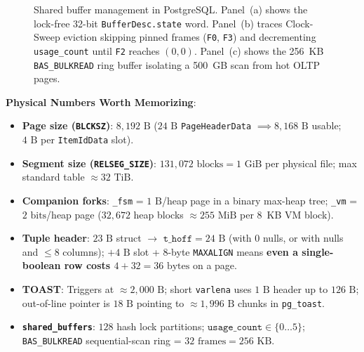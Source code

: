 \begin{figure}[htbp]
{%
}
\caption{Shared buffer management in PostgreSQL. Panel~(a) shows the lock-free 32-bit \texttt{BufferDesc.state} word. Panel~(b) traces Clock-Sweep eviction skipping pinned frames (\texttt{F0}, \texttt{F3}) and decrementing \texttt{usage\_count} until \texttt{F2} reaches $(0, 0)$. Panel~(c) shows the 256~KB \texttt{BAS\_BULKREAD} ring buffer isolating a 500~GB scan from hot OLTP pages.}
\label{fig:ch02-clock-sweep-ring}
\end{figure}

\begin{complexitybox}
\textbf{Physical Numbers Worth Memorizing}:
\begin{itemize}
  \item \textbf{Page size (\texttt{BLCKSZ})}: $8{,}192\text{ B}$ ($24\text{ B}$ \texttt{PageHeaderData} $\implies 8{,}168\text{ B}$ usable; $4\text{ B}$ per \texttt{ItemIdData} slot).
  \item \textbf{Segment size (\texttt{RELSEG\_SIZE})}: $131{,}072\text{ blocks} = 1\text{ GiB}$ per physical file; max standard table $\approx 32\text{ TiB}$.
  \item \textbf{Companion forks}: \texttt{\_fsm} = $1\text{ B}$/heap page in a binary max-heap tree; \texttt{\_vm} = $2\text{ bits}$/heap page ($32{,}672$ heap blocks $\approx 255\text{ MiB}$ per 8~KB VM block).
  \item \textbf{Tuple header}: $23\text{ B}$ struct $\to$ $\texttt{t\_hoff} = 24\text{ B}$ (with 0 nulls, or with nulls and $\le 8$ columns); $+4\text{ B}$ slot + 8-byte \texttt{MAXALIGN} means \textbf{even a single-boolean row costs $4 + 32 = 36\text{ bytes}$} on a page.
  \item \textbf{TOAST}: Triggers at $\approx 2{,}000\text{ B}$; short \texttt{varlena} uses $1\text{ B}$ header up to $126\text{ B}$; out-of-line pointer is $18\text{ B}$ pointing to $\approx 1{,}996\text{ B}$ chunks in \texttt{pg\_toast}.
  \item \textbf{\texttt{shared\_buffers}}: $128$ hash lock partitions; $\texttt{usage\_count} \in \{0 \dots 5\}$; \texttt{BAS\_BULKREAD} sequential-scan ring = $32\text{ frames} = 256\text{ KB}$.
\end{itemize}
\end{complexitybox}

